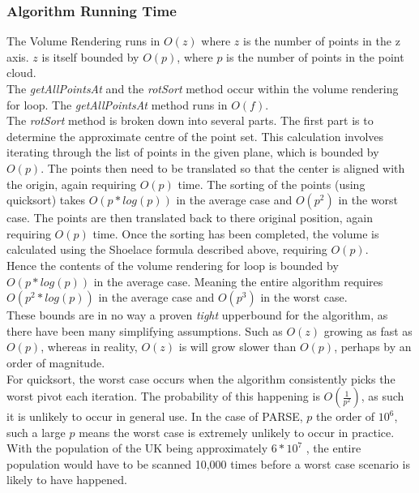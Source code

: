 \subsubsection{Algorithm Running Time}
The Volume Rendering runs in $O(z)$ where $z$ is the number of points in the z axis. 
$z$ is itself bounded by $O(p)$, where $p$ is the number of points in the point cloud. \\

The \textit{getAllPointsAt} and the \textit{rotSort} method occur within the volume rendering for loop. 
The  \textit{getAllPointsAt} method runs in  $O(f)$.\\

The \textit{rotSort} method is broken down into several parts. 
The first part is to determine the approximate centre of the point set. 
This calculation involves iterating through the list of points in the given plane, which is bounded by $O(p)$. 
The points then need to be translated so that the center is aligned with the origin, again requiring $O(p)$ time. 
The sorting of the points (using quicksort) takes $O(p * log(p))$ in the average case and $O(p^2)$ in the worst case. 
The points are then translated back to there original position, again requiring $O(p)$ time. 
Once the sorting has been completed, the volume is calculated using the Shoelace formula described above, requiring $O(p)$.\\

Hence the contents of the volume rendering for loop is bounded by $O(p * log(p))$ in the average case. 
Meaning the entire algorithm requires $O(p^2 * log(p))$ in the average case and $O(p^3)$ in the worst case. \\

These bounds are in no way a proven \textit{tight} upperbound for the algorithm, as there have been many simplifying assumptions. 
Such as $O(z)$ growing as fast as $O(p)$, whereas in reality, $O(z)$ is will grow slower than $O(p)$, perhaps by an order of magnitude.\\

For quicksort, the worst case occurs when the algorithm consistently picks the worst pivot each iteration. 
The probability of this happening is $O(\frac{1}{p^2})$, as such it is unlikely to occur in general use. 
In the case of PARSE, $p$ the order of $10^6$, such a large $p$ means the worst case is extremely unlikely to occur in practice. With the population of the UK being approximately $6 * 10^7$ \cite{UnitedKingdomofGreatBritain2011}, the entire population would have to be scanned 10,000 times before a worst case scenario is likely to have happened.